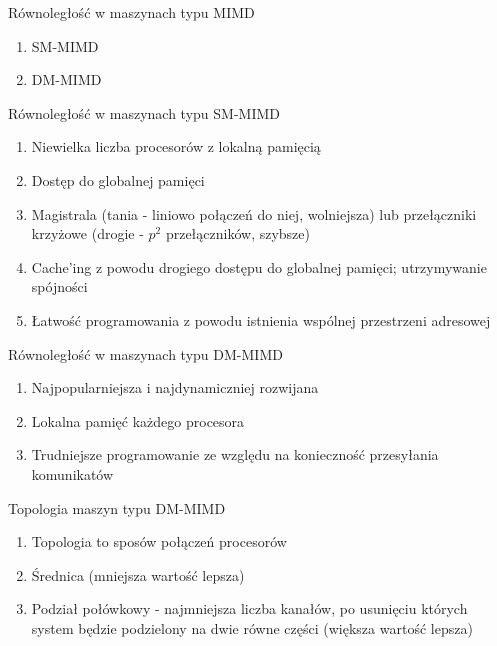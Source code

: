 \documentclass{beamer}
\begin{document}
\begin{frame}{Równoległość w maszynach typu MIMD}
  \begin{enumerate}
  \item SM-MIMD
  \item DM-MIMD
  \end{enumerate}
\end{frame}

\begin{frame}{Równoległość w maszynach typu SM-MIMD}
  \begin{enumerate}
  \item Niewielka liczba procesorów z lokalną pamięcią
  \item Dostęp do globalnej pamięci
  \item Magistrala (tania - liniowo połączeń do niej, wolniejsza) lub przełączniki krzyżowe (drogie - $p^2$ przełączników, szybsze)
  \item Cache'ing z powodu drogiego dostępu do globalnej pamięci; utrzymywanie spójności
  \item Łatwość programowania z powodu istnienia wspólnej przestrzeni adresowej
  \end{enumerate}
\end{frame}

\begin{frame}{Równoległość w maszynach typu DM-MIMD}
  \begin{enumerate}
  \item Najpopularniejsza i najdynamiczniej rozwijana
  \item Lokalna pamięć każdego procesora
  \item Trudniejsze programowanie ze względu na konieczność przesyłania komunikatów
  \end{enumerate}
\end{frame}

\begin{frame}{Topologia maszyn typu DM-MIMD}
  \begin{enumerate}
  \item Topologia to sposów połączeń procesorów
  \item Średnica (mniejsza wartość lepsza)
  \item Podział połówkowy - najmniejsza liczba kanałów, po usunięciu których system będzie podzielony na dwie równe części (większa wartość lepsza)
  \end{enumerate}
\end{frame}
\end{document}
